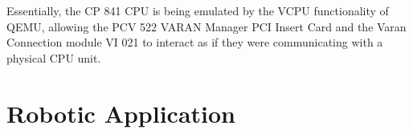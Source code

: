 \documentclass[MMR,Master,english]{twbook}
\begin{document}
\noindent Essentially, the CP 841 CPU is being emulated by the VCPU functionality of QEMU, allowing the PCV 522 VARAN Manager PCI Insert Card and the Varan Connection module VI 021 to interact as if they were communicating with a physical CPU unit.

\clearpage
\section{Robotic Application}

\clearpage

\end{document}

